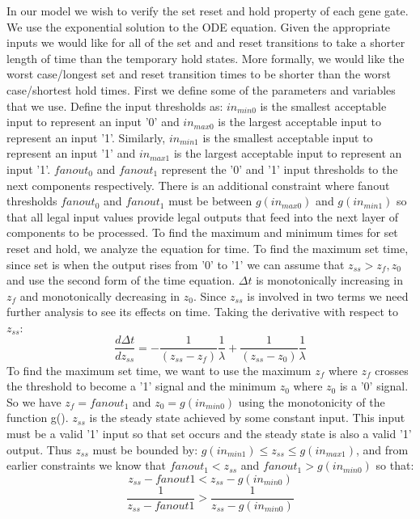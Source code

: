 \documentclass{article}
\begin{document}
In our model we wish to verify the set reset and hold property of each gene gate.  We use the exponential solution to the ODE equation.  Given the appropriate inputs we would like for all of the set and and reset transitions to take a shorter length of time than the temporary hold states.  More formally, we would like the worst case/longest set and reset transition times to be shorter than the worst case/shortest hold times.  First we define some of the parameters and variables that we use.  Define the input thresholds as:  $in_{min0}$ is the smallest acceptable input to represent an input '0' and $in_{max0}$ is the largest acceptable input to represent an input '1'.  Similarly, $in_{min1}$ is the smallest acceptable input to represent an input '1' and $in_{max1}$ is the largest acceptable input to represent an input '1'.  $fanout_0$ and $fanout_1$ represent the '0' and '1' input thresholds to the next components respectively.  There is an additional constraint where fanout thresholds $fanout_0$ and $fanout_1$ must be between $g(in_{max0})$ and $g(in_{min1})$ so that all legal input values provide legal outputs that feed into the next layer of components to be processed.
\newline \newline
To find the maximum and minimum times for set reset and hold, we analyze the equation for time.  To find the maximum set time, since set is when the output rises from '0' to '1' we can assume that $z_{ss}>z_f, z_0$ and use the second form of the time equation. $\Delta t$ is monotonically increasing in $z_f$ and monotonically decreasing in $z_0$.  Since $z_{ss}$ is involved in two terms we need further analysis to see its effects on time.  Taking the derivative with respect to $z_{ss}$:
\[\frac{d\Delta t}{dz_{ss}}=- \frac{1}{(z_{ss}-z_f)}\frac{1}{\lambda}+ \frac{1}{(z_{ss}-z_0)}\frac{1}{\lambda}
\]
To find the maximum set time, we want to use the maximum $z_f$ where $z_f$ crosses the threshold to become a '1' signal and the minimum $z_0$ where $z_0$ is a '0' signal.  So we have $z_f=fanout_1$ and $z_0=g(in_{min0})$ using the monotonicity of the function g().  $z_{ss}$ is the steady state achieved by some constant input.  This input must be a valid '1' input so that set occurs and the steady state is also a valid '1' output.  Thus $z_{ss}$ must be bounded by: $g(in_{min1})\leq z_{ss}\leq g(in_{max1})$, and from earlier constraints we know that $fanout_1<z_{ss}$ and $fanout_1>g(in_{min0})$ so that:
\[z_{ss}-fanout1< z_{ss}-g(in_{min0})
\]
\[\frac{1}{z_{ss}-fanout1}>\frac{1}{z_{ss}-g(in_{min0})}
\]
\end{document}
